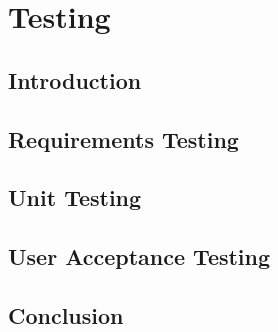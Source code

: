 \chapter{Testing}
\section{Introduction}
\section{Requirements Testing}
\section{Unit Testing}
\section{User Acceptance Testing}
\section{Conclusion}